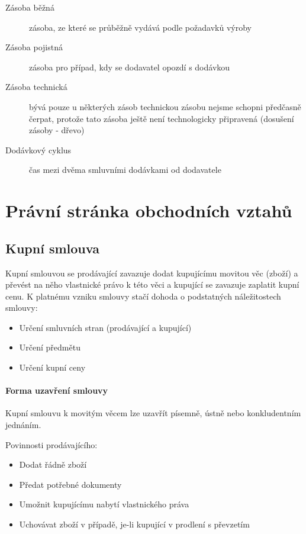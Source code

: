 \begin{description}
    \item[Zásoba běžná] zásoba, ze které se průběžně vydává podle požadavků výroby
    \item[Zásoba pojistná] zásoba pro případ, kdy se dodavatel opozdí s dodávkou
    \item[Zásoba technická] bývá pouze u některých zásob technickou zásobu nejsme schopni předčasně čerpat, protože tato zásoba ještě není technologicky připravená (dosušení zásoby - dřevo)
    \item[Dodávkový cyklus] čas mezi dvěma smluvními dodávkami od dodavatele
\end{description}

\section*{Právní stránka obchodních vztahů}
\subsection*{Kupní smlouva}
Kupní smlouvou se prodávající zavazuje dodat kupujícímu movitou věc (zboží) a převést na něho vlastnické právo k této věci a kupující se zavazuje zaplatit kupní cenu. K platnému vzniku smlouvy stačí dohoda o podstatných náležitostech smlouvy:
\begin{itemize}
    \item Určení smluvních stran (prodávající a kupující)
    \item Určení předmětu
    \item Určení kupní ceny
\end{itemize}

\paragraph*{Forma uzavření smlouvy}
Kupní smlouvu k movitým věcem lze uzavřít písemně, ústně nebo konkludentním jednáním.

Povinnosti prodávajícího:
\begin{itemize}
    \item Dodat řádně zboží
    \item Předat potřebné dokumenty
    \item Umožnit kupujícímu nabytí vlastnického práva
    \item Uchovávat zboží v případě, je-li kupující v prodlení s převzetím	
\end{itemize}

